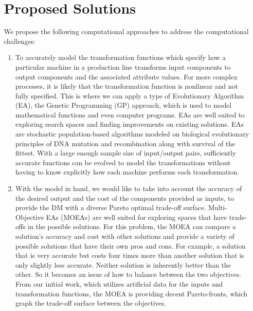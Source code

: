 \documentclass{IEEEtran}
\begin{document}
\section{Proposed Solutions}
We propose the following computational approaches to address the computational challenges:
\begin{enumerate}
\item To accurately model the transformation functions which specify how a particular machine in a production line transforms input components to output components and the associated attribute values. For more complex processes, it is likely that the transformation function is nonlinear and not fully specified. This is where we can apply a type of Evolutionary Algorithm (EA), the Genetic Programming (GP) approach, which is used to model mathematical functions and even computer programs. EAs are well suited to exploring search spaces and finding improvements on existing solutions. EAs are stochastic population-based algorithms modeled on biological evolutionary principles of DNA mutation and recombination along with survival of the fittest. With a large enough sample size of input/output pairs, sufficiently accurate functions can be evolved to model the transformations without having to know explicitly how each machine performs each transformation.
\item With the model in hand, we would like to take into account the accuracy of the desired output and the cost of the components provided as inputs, to provide the DM with a diverse Pareto optimal trade-off surface. Multi-Objective EAs (MOEAs) are well suited for exploring spaces that have trade-offs in the possible solutions. For this problem, the MOEA can compare a solution’s accuracy and cost with other solutions and provide a variety of possible solutions that have their own pros and cons. For example, a solution that is very accurate but costs four times more than another solution that is only slightly less accurate. Neither solution is inherently better than the other. So it becomes an issue of how to balance between the two objectives. From our initial work, which utilizes artificial data for the inputs and transformation functions, the MOEA is providing decent Pareto-fronts, which graph the trade-off surface between the objectives.
\end{enumerate}
\end{document}

